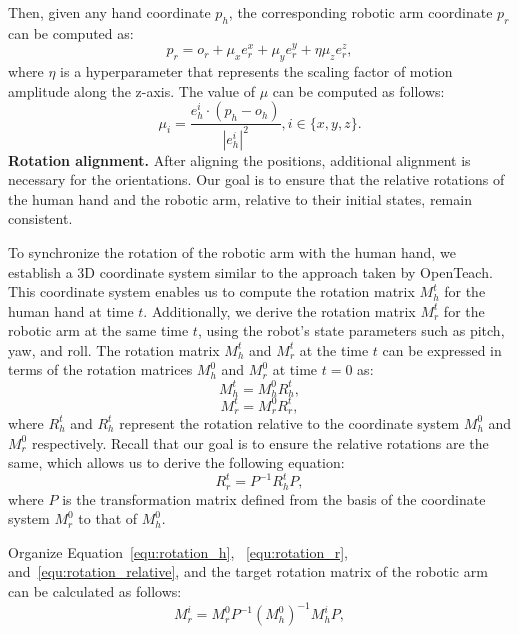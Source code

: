 Then, given any hand coordinate $p_h$, the corresponding robotic arm coordinate $p_r$ can be computed as:
\begin{equation}
p_r = o_r + \mu_x e_r^x + \mu_y e_r^y + \eta \mu_z e_r^z,
\end{equation}
where $\eta$ is a hyperparameter that represents the scaling factor of motion amplitude along the z-axis. The value of $\mu$ can be computed as follows:
\begin{equation}
\mu_i = \frac{e_h^i\cdot (p_h - o_h)}{|e_h^i|^2}, i \in \{ x, y, z \}.
\end{equation}
\noindent\textbf{Rotation alignment.}
After aligning the positions, additional alignment is necessary for the orientations. Our goal is to ensure that the relative rotations of the human hand and the robotic arm, relative to their initial states, remain consistent. 

To synchronize the rotation of the robotic arm with the human hand, we establish a 3D coordinate system similar to the approach taken by OpenTeach\cite{iyer2024open}. This coordinate system enables us to compute the rotation matrix $M_h^t$ for the human hand at time $t$. Additionally, we derive the rotation matrix $M_r^t$ for the robotic arm at the same time $t$, using the robot's state parameters such as pitch, yaw, and roll. The rotation matrix $M_h^t$ and $M_r^t$ at the time $t$ can be expressed in terms of the rotation matrices $M_h^0$ and $M_r^0$ at time $t = 0$ as:
\begin{equation}
    M_h^t = M_h^0 R_h^t,
    \label{equ:rotation_h}
\end{equation}
\begin{equation}
    M_r^t = M_r^0 R_r^t,
    \label{equ:rotation_r}
\end{equation}
where $R_h^t$ and $R_h^t$ represent the rotation relative to the coordinate system $M_h^0$ and $M_r^0$ respectively. Recall that our goal is to ensure the relative rotations are the same, which allows us to derive the following equation:
\begin{equation}
    R_r^t = P^{-1}R_h^tP,
    \label{equ:rotation_relative}
\end{equation}
where $P$ is the transformation matrix defined from the basis of the coordinate system $M_r^0$ to that of $M_h^0$.

Organize Equation~\ref{equ:rotation_h}, ~\ref{equ:rotation_r}, and~\ref{equ:rotation_relative}, and the target rotation matrix of the robotic arm can be calculated as follows:
\begin{equation}
M_r^{i} = M_r^0 P^{-1} (M_h^{0})^{-1} M_h^{i} P,
\end{equation}


